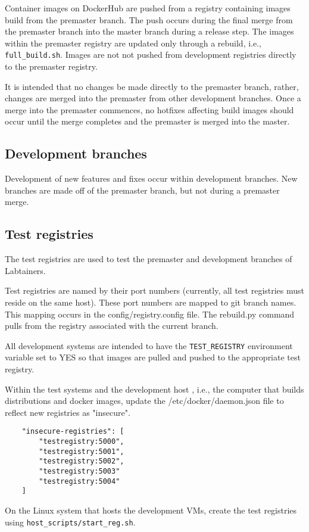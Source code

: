 \documentclass[12pt]{article}
\begin{document}
Container images on DockerHub are
pushed from a registry containing images build from the premaster branch. The push occurs during the final merge from the
premaster branch into the master branch during a release step.  The images within the premaster registry are updated only through
a rebuild, i.e., {\tt full\_build.sh}.  Images are not not pushed from development registries directly to the premaster registry.

It is intended that no changes be made directly to the premaster branch, rather, changes are merged into the premaster from
other development branches.  Once a merge into the premaster commences, no hotfixes affecting build images should occur until
the merge completes and the premaster is merged into the master.

\subsection{Development branches}
Development of new features and fixes occur within development branches.
New branches are made off of the premaster branch, but not during a premaster merge.

\subsection{Test registries}
The test registries are used to test the premaster and development branches of Labtainers.

Test registries are named by their port numbers (currently, all test registries must reside on the same host).  
These port numbers are mapped to git branch names.  This mapping occurs in the 
config/registry.config file.
The rebuild.py command pulls from the registry associated with the current branch.

All development systems are intended to have the {\tt TEST\_REGISTRY} environment variable set to YES so that images are
pulled and pushed to the appropriate test registry.

Within the test systems and the development host , i.e., the computer that builds distributions and docker images, update 
the /etc/docker/daemon.json file to reflect new registries as "insecure".
\begin{verbatim}
    "insecure-registries": [
        "testregistry:5000",
        "testregistry:5001",
        "testregistry:5002",
        "testregistry:5003"
        "testregistry:5004"
    ]
\end{verbatim}
\noindent On the Linux system that hosts the development VMs, create the test registries using {\tt host\_scripts/start\_reg.sh}.
\end{document}
